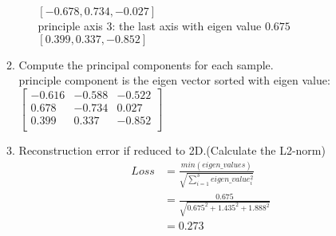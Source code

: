 \documentclass[12pt, a4paper]{article}
\begin{document}
\begin{enumerate}
\begin{enumerate}
\begin{enumerate}
    $[-0.678,0.734,-0.027]$\\
    principle axis 3: the last axis with eigen value $0.675$\\
    $[0.399,0.337,-0.852]$
    \end{enumerate}
    \item Compute the principal components for each sample.\\
    principle component is the eigen vector sorted with eigen value:
    $\begin{bmatrix}
        -0.616&-0.588&-0.522\\
        0.678&-0.734&0.027\\
        0.399&0.337&-0.852\\
    \end{bmatrix}$
    \item Reconstruction error if reduced to 2D.(Calculate the L2-norm)\\
    \begin{align*}
        Loss &= \frac{min(eigen\_values)}{\sqrt{\sum\limits^3_{i=1}eigen\_value_i^2}}\\
        &= \frac{0.675}{\sqrt{0.675^2+1.435^2+1.888^2}}\\
        &= 0.273\\
    \end{align*}
\end{enumerate}

\end{enumerate}
\end{document}
